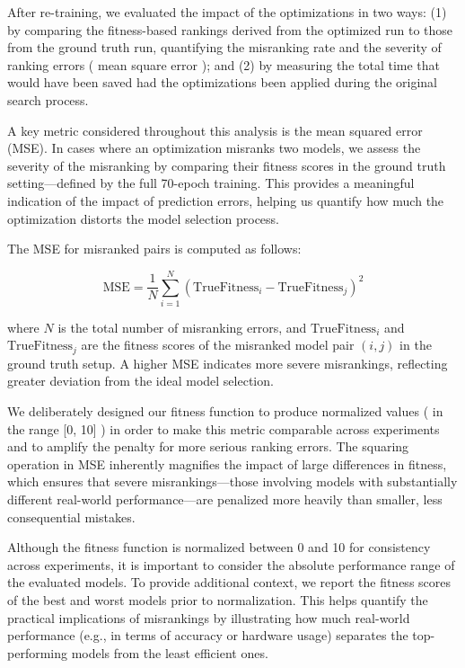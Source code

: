 After re-training, we evaluated the impact of the optimizations in two ways: (1) by comparing the fitness-based rankings derived from the optimized run to those from the ground truth run, quantifying the misranking rate and the severity of ranking errors ( mean square error ); and (2) by measuring the total time that would have been saved had the optimizations been applied during the original search process.


A key metric considered throughout this analysis is the mean squared error (MSE). In cases where an optimization misranks two models, we assess the severity of the misranking by comparing their fitness scores in the ground truth setting—defined by the full 70-epoch training. This provides a meaningful indication of the impact of prediction errors, helping us quantify how much the optimization distorts the model selection process.

The MSE for misranked pairs is computed as follows:

\begin{equation}
\text{MSE} = \frac{1}{N} \sum_{i=1}^{N} \left( \text{TrueFitness}_i - \text{TrueFitness}_j \right)^2
\end{equation}

where \( N \) is the total number of misranking errors, and \( \text{TrueFitness}_i \) and \( \text{TrueFitness}_j \) are the fitness scores of the misranked model pair \( (i, j) \) in the ground truth setup. A higher MSE indicates more severe misrankings, reflecting greater deviation from the ideal model selection.

We deliberately designed our fitness function to produce normalized values ( in the range [0, 10] ) in order to make this metric comparable across experiments and to amplify the penalty for more serious ranking errors. The squaring operation in MSE inherently magnifies the impact of large differences in fitness, which ensures that severe misrankings—those involving models with substantially different real-world performance—are penalized more heavily than smaller, less consequential mistakes.

Although the fitness function is normalized between 0 and 10 for consistency across experiments, it is important to consider the absolute performance range of the evaluated models. To provide additional context, we report the fitness scores of the best and worst models prior to normalization. This helps quantify the practical implications of misrankings by illustrating how much real-world performance (e.g., in terms of accuracy or hardware usage) separates the top-performing models from the least efficient ones.

